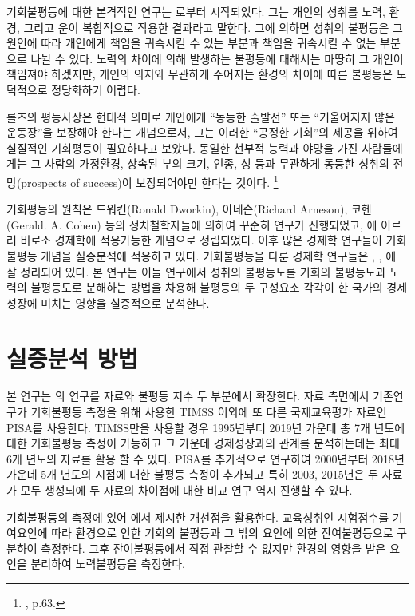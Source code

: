 기회불평등에 대한 본격적인 연구는 \cite{Rawls99}로부터 시작되었다.
 그는 개인의 성취를 노력, 환경, 그리고 운이 복합적으로 작용한 결과라고 말한다.
 그에 의하면 성취의 불평등은 그 원인에 따라 개인에게 책임을 귀속시킬 수 있는 부분과 책임을 귀속시킬 수 없는 부분으로 나뉠 수 있다.
 노력의 차이에 의해 발생하는 불평등에 대해서는 마땅히 그 개인이 책임져야 하겠지만, 개인의 의지와 무관하게 주어지는 환경의 차이에 따른 불평등은 도덕적으로 정당화하기 어렵다.
 
롤즈의 평등사상은 현대적 의미로 개인에게 “동등한 출발선” 또는 “기울어지지 않은 운동장”을 보장해야 한다는 개념으로서, 그는 이러한 “공정한 기회”의 제공을 위하여 실질적인 기회평등이 필요하다고 보았다.
동일한 천부적 능력과 야망을 가진 사람들에게는 그 사람의 가정환경, 상속된 부의 크기, 인종, 성 등과 무관하게 동등한 성취의 전망(prospects of success)이 보장되어야만 한다는 것이다.
\footnote{\cite{Rawls99}, p.63.}

기회평등의 원칙은 드워킨(Ronald Dworkin), 아네슨(Richard Arneson), 코헨(Gerald. A. Cohen) 등의 정치철학자들에 의하여 꾸준히 연구가 진행되었고, \cite{Roemer98}에 이르러 비로소 경제학에 적용가능한 개념으로 정립되었다.
\cite{Roemer98} 이후 많은 경제학 연구들이 기회불평등 개념을 실증분석에 적용하고 있다.
 기회불평등을 다룬 경제학 연구들은 \cite{rnv12}, \cite{fnp15}, \cite{rnt16}에 잘 정리되어 있다.
본 연구는 이들 연구에서 성취의 불평등도를 기회의 불평등도과 노력의 불평등도로 분해하는 방법을 차용해 불평등의 두 구성요소 각각이 한 국가의 경제성장에 미치는 영향을 실증적으로 분석한다.

\section{실증분석 방법}

본 연구는 \cite{kno17}의 연구를 자료와 불평등 지수 두 부분에서 확장한다.
자료 측면에서 기존연구가 기회불평등 측정을 위해 사용한 TIMSS 이외에 또 다른 국제교육평가 자료인 PISA를 사용한다. TIMSS만을 사용할 경우 1995년부터 2019년 가운데 총 7개 년도에 대한 기회불평등 측정이 가능하고 그 가운데 경제성장과의 관계를 분석하는데는 최대 6개 년도의 자료를 활용 할 수 있다. PISA를 추가적으로 연구하여 2000년부터 2018년 가운데 5개 년도의 시점에 대한 불평등 측정이 추가되고 특히 2003, 2015년은 두 자료가 모두 생성되에 두 자료의 차이점에 대한 비교 연구 역시 진행할 수 있다.

기회불평등의 측정에 있어 \cite{betl12}에서 제시한 개선점을 활용한다.
교육성취인 시험점수를 기여요인에 따라 환경으로 인한 기회의 불평등과 그 밖의 요인에 의한 잔여불평등으로 구분하여 측정한다.
그후 잔여불평등에서 직접 관찰할 수 없지만 환경의 영향을 받은 요인을 분리하여 노력불평등을 측정한다.

